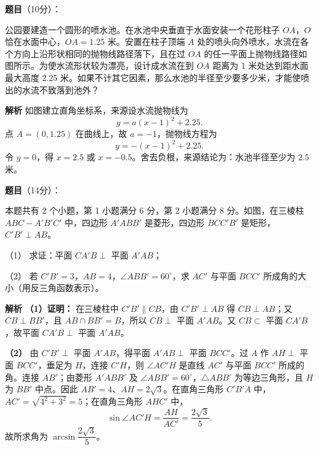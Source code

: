 \begin{answer}

\textbf{题目}（10分）：

公园要建造一个圆形的喷水池。在水池中央垂直于水面安装一个花形柱子 $OA$，$O$ 恰在水面中心，$OA=1.25$ 米。安置在柱子顶端 $A$ 处的喷头向外喷水，水流在各个方向上沿形状相同的抛物线路径落下，且在过 $OA$ 的任一平面上抛物线路径如图所示。为使水流形状较为漂亮，设计成水流在到 $OA$ 距离为 1 米处达到距水面最大高度 2.25 米。如果不计其它因素，那么水池的半径至少要多少米，才能使喷出的水流不致落到池外？
\nopagebreak[4]
\begin{center}\end{center}
\nopagebreak[4]
\textbf{解析}
如图建立直角坐标系，来源设水流抛物线为
\nopagebreak[4]
\[y=a(x-1)^2+2.25.\]
点 $A=(0,1.25)$ 在曲线上，故 $a=-1$，抛物线方程为
\nopagebreak[4]
\[y=-(x-1)^2+2.25.\]
令 $y=0$，得 $x=2.5$ 或 $x=-0.5$。舍去负根，来源结论为：水池半径至少为 $2.5$ 米。


\end{answer}
\begin{answer}

\textbf{题目}（14分）：

本题共有 2 个小题，第 1 小题满分 6 分，第 2 小题满分 8 分。如图，在三棱柱 $ABC-A'B'C'$ 中，四边形 $A'ABB'$ 是菱形，四边形 $BCC'B'$ 是矩形，$C'B'\perp AB$。

（1） 求证：平面 $CA'B\perp$ 平面 $A'AB$；

（2） 若 $C'B'=3$，$AB=4$，$\angle ABB'=60^\circ$，求 $AC'$ 与平面 $BCC'$ 所成角的大小（用反三角函数表示）。
\nopagebreak[4]
\begin{center}\end{center}
\nopagebreak[4]
\textbf{解析}
\textbf{（1）证明：} 在三棱柱中 $C'B'\parallel CB$，由 $C'B'\perp AB$ 得 $CB\perp AB$；又 $CB\perp BB'$，且 $AB\cap BB'=B$，所以 $CB\perp$ 平面 $A'AB$。又 $CB\subset$ 平面 $CA'B$，故平面 $CA'B\perp$ 平面 $A'AB$。

\textbf{（2）} 由 $C'B'\perp$ 平面 $A'AB$，得平面 $A'AB\perp$ 平面 $BCC'$。过 $A$ 作 $AH\perp$ 平面 $BCC'$，垂足为 $H$，连接 $C'H$，则 $\angle AC'H$ 是直线 $AC'$ 与平面 $BCC'$ 所成的角。连接 $AB'$；由菱形 $A'ABB'$ 及 $\angle ABB'=60^\circ$，$\triangle ABB'$ 为等边三角形，且 $H$ 为 $BB'$ 中点。因此 $AB'=4$、$AH=2\sqrt3$。在直角三角形 $C'B'A$ 中，$AC'=\sqrt{4^2+3^2}=5$；在直角三角形 $AHC'$ 中，
\nopagebreak[4]
\[\sin\angle AC'H=\frac{AH}{AC'}=\frac{2\sqrt3}{5}.\]
故所求角为 $\arcsin\dfrac{2\sqrt3}{5}$。



\end{answer}
